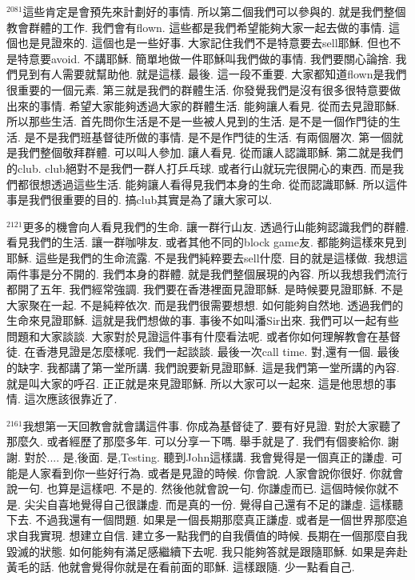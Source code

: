 \documentclass{book}
\begin{document}
$^{2081}$這些肯定是會預先來計劃好的事情.
所以第二個我們可以參與的.
就是我們整個教會群體的工作.
我們會有flown.
這些都是我們希望能夠大家一起去做的事情.
這個也是見證來的.
這個也是一些好事.
大家記住我們不是特意要去sell耶穌.
但也不是特意要avoid.
不講耶穌.
簡單地做一件耶穌叫我們做的事情.
我們要關心論捨.
我們見到有人需要就幫助他.
就是這樣.
最後.
這一段不重要.
大家都知道flown是我們很重要的一個元素.
第三就是我們的群體生活.
你發覺我們是沒有很多很特意要做出來的事情.
希望大家能夠透過大家的群體生活.
能夠讓人看見.
從而去見證耶穌.
所以那些生活.
首先問你生活是不是一些被人見到的生活.
是不是一個作門徒的生活.
是不是我們班基督徒所做的事情.
是不是作門徒的生活.
有兩個層次.
第一個就是我們整個敬拜群體.
可以叫人參加.
讓人看見.
從而讓人認識耶穌.
第二就是我們的club.
club絕對不是我們一群人打乒乓球.
或者行山就玩完很開心的東西.
而是我們都很想透過這些生活.
能夠讓人看得見我們本身的生命.
從而認識耶穌.
所以這件事是我們很重要的目的.
搞club其實是為了讓大家可以.

$^{2121}$更多的機會向人看見我們的生命.
讓一群行山友.
透過行山能夠認識我們的群體.
看見我們的生活.
讓一群咖啡友.
或者其他不同的block game友.
都能夠這樣來見到耶穌.
這些是我們的生命流露.
不是我們純粹要去sell什麼.
目的就是這樣做.
我想這兩件事是分不開的.
我們本身的群體.
就是我們整個展現的內容.
所以我想我們流行都開了五年.
我們經常強調.
我們要在香港裡面見證耶穌.
是時候要見證耶穌.
不是大家聚在一起.
不是純粹依次.
而是我們很需要想想.
如何能夠自然地.
透過我們的生命來見證耶穌.
這就是我們想做的事.
事後不如叫潘Sir出來.
我們可以一起有些問題和大家談談.
大家對於見證這件事有什麼看法呢.
或者你如何理解教會在基督徒.
在香港見證是怎麼樣呢.
我們一起談談.
最後一次call time.
對,還有一個.
最後的缺字.
我都講了第一堂所講.
我們說要新見證耶穌.
這是我們第一堂所講的內容.
就是叫大家的呼召.
正正就是來見證耶穌.
所以大家可以一起來.
這是他思想的事情.
這次應該很靠近了.

$^{2161}$我想第一天回教會就會講這件事.
你成為基督徒了.
要有好見證.
對於大家聽了那麼久.
或者經歷了那麼多年.
可以分享一下嗎.
舉手就是了.
我們有個麥給你.
謝謝.
對於....
是,後面.
是,Testing.
聽到John這樣講.
我會覺得是一個真正的謙虛.
可能是人家看到你一些好行為.
或者是見證的時候.
你會說.
人家會說你很好.
你就會說一句.
也算是這樣吧.
不是的.
然後他就會說一句.
你謙虛而已.
這個時候你就不是.
尖尖自喜地覺得自己很謙虛.
而是真的一份.
覺得自己還有不足的謙虛.
這樣聽下去.
不過我還有一個問題.
如果是一個長期那麼真正謙虛.
或者是一個世界那麼追求自我實現.
想建立自信.
建立多一點我們的自我價值的時候.
長期在一個那麼自我毀滅的狀態.
如何能夠有滿足感繼續下去呢.
我只能夠答就是跟隨耶穌.
如果是奔赴黃毛的話.
他就會覺得你就是在看前面的耶穌.
這樣跟隨.
少一點看自己.
\end{document}
